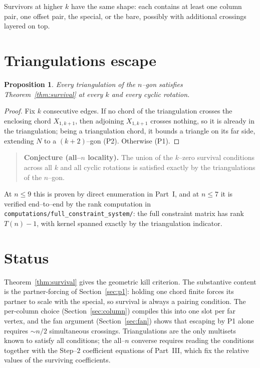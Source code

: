 \documentclass[11pt]{article}
\newtheorem{proposition}{Proposition}
\theoremstyle{definition}
\newcommand{\X}[1]{X_{#1}}
\begin{document}
\noindent Survivors at higher $k$ have the same shape: each contains at least one column pair, one
offset pair, the special, or the bare, possibly with additional crossings layered on top.

\section{Triangulations escape}\label{sec:triangs}
\begin{proposition}\label{prop:tri-escape}
Every triangulation of the $n$--gon satisfies Theorem~\ref{thm:survival} at every $k$ and every
cyclic rotation.
\end{proposition}
\begin{proof}
Fix $k$ consecutive edges. If no chord of the triangulation crosses the enclosing chord
$\X{1,k+1}$, then adjoining $\X{1,k+1}$ crosses nothing, so it is already in the triangulation; being
a triangulation chord, it bounds a triangle on its far side, extending $N$ to a $(k{+}2)$--gon
(P2). Otherwise (P1).
\end{proof}

\begin{quote}
\textbf{Conjecture (all--$n$ locality).} The union of the $k$--zero survival conditions across all
$k$ and all cyclic rotations is satisfied exactly by the triangulations of the $n$--gon.
\end{quote}
\noindent At $n\le 9$ this is proven by direct enumeration in Part~I, and at $n\le 7$ it is
verified end--to--end by the rank computation in
\texttt{computations/full\_constraint\_system/}: the full constraint matrix has rank $T(n)-1$,
with kernel spanned exactly by the triangulation indicator.

\section{Status}\label{sec:status}
Theorem~\ref{thm:survival} gives the geometric kill criterion. The substantive content is the
partner-forcing of Section~\ref{sec:p1}: holding one chord finite forces its partner to scale with
the special, so survival is always a pairing condition. The per-column choice
(Section~\ref{sec:column}) compiles this into one slot per far vertex, and the fan argument
(Section~\ref{sec:fan}) shows that escaping by P1 alone requires $\sim n/2$ simultaneous crossings.
Triangulations are the only multisets known to satisfy all conditions; the all--$n$ converse
requires reading the conditions together with the Step--$2$ coefficient equations of Part~III,
which fix the relative values of the surviving coefficients.
\end{document}
